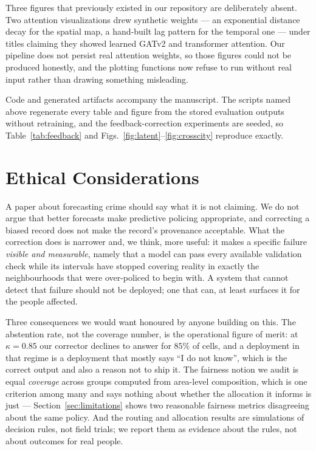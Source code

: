 \documentclass[journal,10pt,twocolumn]{IEEEtran}
\begin{document}
Three figures that previously existed in our repository are deliberately absent.
Two attention visualizations drew synthetic weights --- an exponential distance
decay for the spatial map, a hand-built lag pattern for the temporal one --- under
titles claiming they showed learned GATv2 and transformer attention. Our pipeline
does not persist real attention weights, so those figures could not be produced
honestly, and the plotting functions now refuse to run without real input rather
than drawing something misleading.

Code and generated artifacts accompany the manuscript. The scripts named above
regenerate every table and figure from the stored evaluation outputs without
retraining, and the feedback-correction experiments are seeded, so
Table~\ref{tab:feedback} and Figs.~\ref{fig:latent}--\ref{fig:crosscity}
reproduce exactly.

\section*{Ethical Considerations}
A paper about forecasting crime should say what it is not claiming. We do not
argue that better forecasts make predictive policing appropriate, and correcting
a biased record does not make the record's provenance acceptable. What the
correction does is narrower and, we think, more useful: it makes a specific
failure \emph{visible and measurable}, namely that a model can pass every
available validation check while its intervals have stopped covering reality in
exactly the neighbourhoods that were over-policed to begin with. A system that
cannot detect that failure should not be deployed; one that can, at least
surfaces it for the people affected.

Three consequences we would want honoured by anyone building on this. The
abstention rate, not the coverage number, is the operational figure of merit: at
$\kappa = 0.85$ our corrector declines to answer for $85\%$ of cells, and a
deployment in that regime is a deployment that mostly says ``I do not know'',
which is the correct output and also a reason not to ship it. The fairness notion
we audit is equal \emph{coverage} across groups computed from area-level
composition, which is one criterion among many and says nothing about whether the
allocation it informs is just --- Section~\ref{sec:limitations} shows two
reasonable fairness metrics disagreeing about the same policy. And the routing
and allocation results are simulations of decision rules, not field trials; we
report them as evidence about the rules, not about outcomes for real people.



\end{document}
